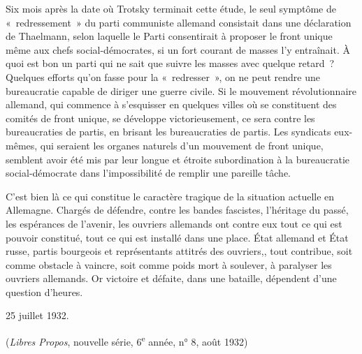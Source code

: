 \documentclass[french,twoside]{book} %
\begin{document}
Six mois après la date où Trotsky terminait cette étude, le seul symptôme de « redressement » du parti communiste allemand consistait dans une décla­ration de Thaelmann, selon laquelle le Parti consentirait à proposer le front unique même aux chefs social-démocrates, si un fort courant de masses l'y entraînait. À quoi est bon un parti qui ne sait que suivre les masses avec quelque retard ? Quelques efforts qu'on fasse pour la « redresser », on ne peut rendre une bureaucratie capable de diriger une guerre civile. Si le mouvement révolutionnaire allemand, qui commence à s'esquisser en quelques villes où se constituent des comités de front unique, se développe victorieusement, ce sera contre les bureaucraties de partis, en brisant les bureaucraties de partis. Les syndicats eux-mêmes, qui seraient les organes naturels d'un mouvement de front unique, semblent avoir été mis par leur longue et étroite subordination à la bureaucratie social-démocrate dans l'impossibilité de remplir une pareille tâche.\par
C'est bien là ce qui constitue le caractère tragique de la situation actuelle en Allemagne. Chargés de défendre, contre les bandes fascistes, l'héritage du passé, les espérances de l'avenir, les ouvriers allemands ont contre eux tout ce qui est pouvoir constitué, tout ce qui est installé dans une place. État allemand et État russe, partis bourgeois et représentants attitrés des ouvriers,, tout contribue, soit comme obstacle à vaincre, soit comme poids mort à soulever, à paralyser les ouvriers allemands. Or victoire et défaite, dans une bataille, dépendent d'une question d'heures.\par
25 juillet 1932.\par
({\itshape Libres Propos}, nouvelle série, 6\textsuperscript{e} année, n° 8, août 1932)\par
\end{document}
